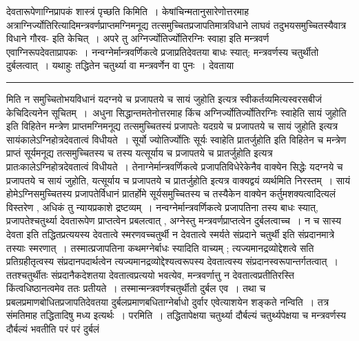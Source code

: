 \documentclass[11pt, openany]{book}
\begin{document}
 देवतारूपेणाग्निप्रापकं शास्त्रं पृच्छति {\br किमिति~।} केषांचिन्मतानुसारेणोत्तरमाह अत्राग्निर्ज्योतिरित्यादिमन्त्रवर्णप्राप्तमग्निमनूद्य 
तत्समुच्चितप्रजापतिमात्रविधाने लाघवं तदुभयसमुच्चितस्यैवात्र विधाने गौरव-
\newpage
\fancyhead[RE]{[ देवतारूपेणा प्रश्नः ]}
{  इति केचित्~। अपरे तु  {\qtl अग्निर्ज्योतिर्ज्योतिरग्निः स्वाहा} इति मन्त्रवर्ण एवाग्निरूपदेवताप्रापकः~। नन्वग्नेर्मान्त्रवर्णिकत्वे प्रजाप्रतिदेवतया बाधः स्यात्; मन्त्रवर्णस्य चतुर्थीतो दुर्बलत्वात्~। यथाहुः {\qtl तद्धितेन चतुर्थ्या वा मन्त्रवर्णेन वा पुनः~। देवताया }}\\
\hrule
\vspace{3mm}
\noindent
मिति न समुच्चितोभयविधानं {\qt यदग्नये च प्रजापतये च सायं जुहोति}  इत्यत्र स्वीकर्तव्यमित्यस्वरसबीजं केचिदित्यनेन सूचितम्~।~अधुना सिद्धान्तमतेनोत्तरमाह किंच {\qt अग्निर्ज्योतिर्ज्योतिरग्निः स्वाहेति सायं जुहोति} इति विहितेन मन्त्रेण प्राप्तमग्निमनूद्य तत्समुच्चितस्यं प्रजापतेः {\qt यदग्रये च प्रजापतये च सायं  जुहोति}  इत्यत्र सायंकालेऽग्निहोत्रदेवतात्वं विधीयते~। {\qt सूर्यो ज्योतिर्ज्योतिः सूर्यः स्वाहेति प्रातर्जुहोति} इति विहितेन च मन्त्रेण प्राप्तं सूर्यमनूद्य तत्समुच्चितस्य च  तस्य {\qt यत्सूर्याय च प्रजापतये च प्रातर्जुहोति} इत्यत्र प्रातःकालेऽग्निहोत्रदेवतात्वं  विधीयते~। तेनाग्नेर्मान्त्रवर्णिकत्वे प्रजापतिविधेरेकेनैव वाक्येन सिद्धेः {\qt यदग्नये च  प्रजापतये च सायं जुहोति, यत्सूर्याय च प्रजापतये च प्रातर्जुहोति} इत्यत्र  वाक्यद्वयं  व्यर्थमिति निरस्तम्~। सायं होमेऽग्निसमुच्चितस्य प्रजापतेर्विधानं प्रातर्होमे सूर्यसमुच्चितस्य च तस्यैकेन वाक्येन कर्तुमशक्यत्वादित्यलं विस्तरेण , अधिकं तु न्यायप्रकाशे द्रष्टव्यम्~। नन्वग्नेर्मान्त्रवर्णिकत्वे प्रजापतिना तस्य बाधः
स्यात्, प्रजापतेश्चतुर्थ्या देवतारूपेण प्राप्तत्वेन प्रबलत्वात् , अग्नेस्तु मन्त्रवर्णप्राप्तत्वेन दुर्बलत्वाच्च~। न च  {\qt सास्य देवता}  इति तद्धितप्रत्ययस्य देवतात्वे स्मरणवच्चतुर्थी न
देवतात्वे स्मर्यते  {\qt संप्रदाने चतुर्थी}  इति संप्रदानमात्रे तस्याः स्मरणात्~। तस्मात्प्रजापतिना कथमग्नेर्बाधः स्यादिति वाच्यम् ; त्यज्यमानद्रव्योद्देशत्वे सति प्रतिग्रहीतृत्वस्य संप्रदानपदार्थत्वेन त्यज्यमानद्रव्योद्देश्यत्वरूपस्य देवतात्वस्य संप्रदानस्वरूपान्तर्गतत्वात्~। ततश्चतुर्थीतः संप्रदानैकदेशतया देवतात्वप्रत्ययो भवत्येव, मन्त्रवर्णात्तु न देवतात्वप्रतीतिरस्ति किंत्वधिष्ठानत्वमेव ततः प्रतीयते~। तस्मान्मन्त्रवर्णश्चतुर्थीतो दुर्बल एव~। तथा च प्रबलप्रमाणबोधितप्रजापतिदेवतया दुर्बलप्रमाणबधिताग्नेर्बाधो दुर्वार एवेत्याशयेन शङ्कते {\br नन्विति~।} तत्र संमतिमाह तद्धितादिषु मध्य इत्यर्थः~। {\br परमिति~।} तद्धितापेक्षया  चतुर्थ्या दौर्बल्यं चतुर्थ्यपेक्षया च मन्त्रवर्णस्य दौर्बल्यं भवतीति परं परं दुर्बलं 
\end{document}
